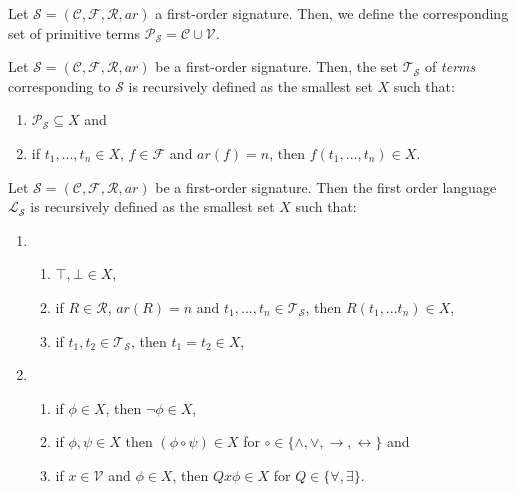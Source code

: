 \begin{definition}\label{def:primitive-term}
    Let $\mathcal{S} = (\mathcal{C},\mathcal{F},\mathcal{R},ar)$ a first-order signature. Then, we define the corresponding set of primitive terms $\mathcal{P}_{\mathcal{S}} = \mathcal{C} \cup \mathcal{V}$.
\end{definition}

\begin{definition}\label{def:FO-term}
    Let $\mathcal{S} = (\mathcal{C},\mathcal{F},\mathcal{R},ar)$ be a first-order signature. Then, the set $\mathcal{T}_{\mathcal{S}}$ of \textit{terms} corresponding to $\mathcal{S}$ is recursively defined as the smallest set $X$ such that:
    \begin{enumerate}
        \item $\mathcal{P}_{\mathcal{S}} \subseteq X$ and
        \item if $t_1,...,t_n \in X$, $f \in \mathcal{F}$ and $ar(f) = n$, then $f(t_1,...,t_n) \in X$.
    \end{enumerate}
\end{definition}

\begin{definition}\label{def:FO-language}
    Let $\mathcal{S} = (\mathcal{C},\mathcal{F},\mathcal{R},ar)$ be a first-order signature. Then the first order language $\mathcal{L}_{\mathcal{S}}$ is recursively defined as the smallest set $X$ such that:
    \begin{enumerate}
        \item \begin{enumerate}
            \item $\top,\bot \in X$,
            \item if $R \in \mathcal{R}$, $ar(R) = n$ and $t_1,...,t_n \in \mathcal{T}_{\mathcal{S}}$, then $R(t_1,...t_n) \in X$,
            \item if $t_1,t_2 \in \mathcal{T}_{\mathcal{S}}$, then $t_1 = t_2 \in X$, 
        \end{enumerate}
        \item \begin{enumerate}
            \item if $\phi \in X$, then $\neg \phi \in X$,
            \item if $\phi, \psi \in X$ then $(\phi \circ \psi) \in X$ for $\circ \in \{\land,\lor,\to,\leftrightarrow\}$ and
            \item if $x \in \mathcal{V}$ and $\phi \in X$, then $Qx\phi \in X$ for $Q \in \{\forall,\exists\}$.
        \end{enumerate}
    \end{enumerate}
\end{definition}

